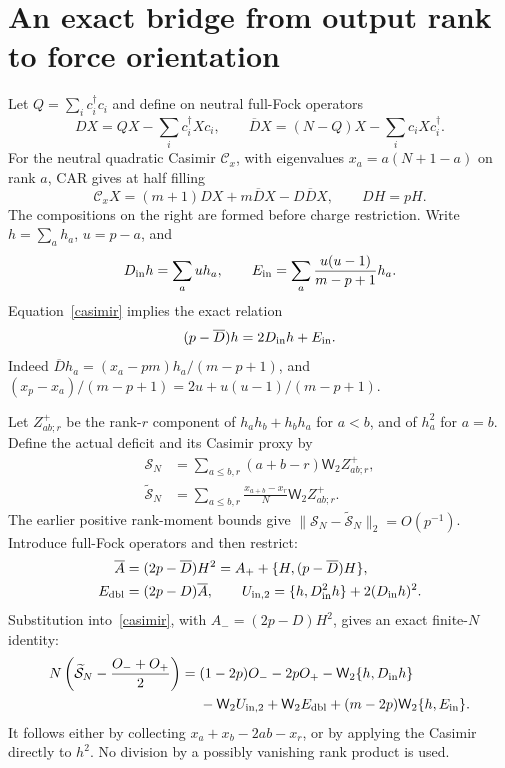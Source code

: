 \documentclass[11pt,a4paper]{article}
\newcommand{\W}[1]{\mathsf W_{#1}}
\newcommand{\Db}{\overline D}
\begin{document}
\newpage
\section{An exact bridge from output rank to force orientation}
Let $Q=\sum_i c_i^\dagger c_i$ and define on neutral full-Fock operators
\begin{equation}
 DX=QX-\sum_i c_i^\dagger Xc_i,\qquad
 \Db X=(N-Q)X-\sum_i c_iXc_i^\dagger.
\end{equation}
For the neutral quadratic Casimir $\mathcal C_x$, with eigenvalues
$x_a=a(N+1-a)$ on rank $a$, CAR gives at half filling
\begin{equation}
 \mathcal C_xX=(m+1)DX+m\Db X-D\Db X,\qquad DH=pH.
 \label{casimir}
\end{equation}
The compositions on the right are formed before charge restriction.
Write $h=\sum_a h_a$, $u=p-a$, and
\begin{equation}
 D_{\rm in}h=\sum_a u h_a,\qquad
 E_{\rm in}=\sum_a\frac{u(u-1)}{m-p+1}h_a.
\end{equation}
Equation~\eqref{casimir} implies the exact relation
\begin{equation}
 (p-\Db)h=2D_{\rm in}h+E_{\rm in}.
 \label{input}
\end{equation}
Indeed $\Db h_a=(x_a-pm)h_a/(m-p+1)$, and
$(x_p-x_a)/(m-p+1)=2u+u(u-1)/(m-p+1)$.

Let $Z^+_{ab;r}$ be the rank-$r$ component of
$h_ah_b+h_bh_a$ for $a<b$, and of $h_a^2$ for $a=b$.
Define the actual deficit and its Casimir proxy by
\begin{align}
 \mathcal S_N&=\sum_{a\leq b,r}(a+b-r)\W2Z^+_{ab;r},\\
 \widetilde{\mathcal S}_N
 &=\sum_{a\leq b,r}\frac{x_{a+b}-x_r}{N}\W2Z^+_{ab;r}.
\end{align}
The earlier positive rank-moment bounds give
$\|\mathcal S_N-\widetilde{\mathcal S}_N\|_2=O(p^{-1})$.
Introduce full-Fock operators and then restrict:
\begin{align}
 \overline A&=(2p-\Db)H^2
       =A_++\{H,(p-\Db)H\},\\
 E_{\rm dbl}&=(2p-D)\overline A,\qquad
 U_{{\rm in},2}=\{h,D_{\rm in}^2h\}+2(D_{\rm in}h)^2.
\end{align}
Substitution into~\eqref{casimir}, with
$A_-=(2p-D)H^2$, gives an exact finite-$N$ identity:
\begin{align}
 N\left(\widetilde{\mathcal S}_N-\frac{O_-+O_+}{2}\right)
 ={}&(1-2p)O_--2pO_+-\W2\{h,D_{\rm in}h\}\notag\\
 &-\W2 U_{{\rm in},2}+\W2 E_{\rm dbl}
 +(m-2p)\W2\{h,E_{\rm in}\}. \label{bridge}
\end{align}
It follows either by collecting $x_a+x_b-2ab-x_r$, or by applying
the Casimir directly to $h^2$. No division by a possibly vanishing
rank product is used.
\end{document}
